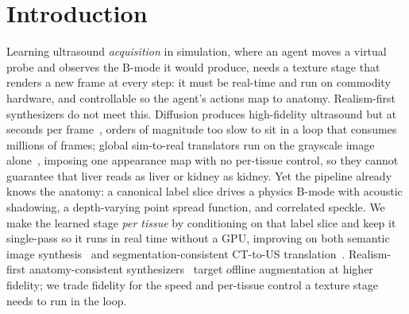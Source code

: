 \documentclass[runningheads]{llncs}
\begin{document}
\section{Introduction}
Learning ultrasound \emph{acquisition} in simulation, where an agent moves a virtual probe and observes
the B-mode it would produce, needs a texture stage that renders a new frame at every step: it must be
real-time and run on commodity hardware, and controllable so the agent's actions map to anatomy.
Realism-first synthesizers do not meet this. Diffusion produces high-fidelity ultrasound but at seconds
per frame~\cite{stojanovski2023echofromnoise}, orders of magnitude too slow to sit in a loop that
consumes millions of frames; global sim-to-real translators run on the grayscale image
alone~\cite{song2024scyclegan}, imposing one appearance map with no per-tissue control, so they cannot
guarantee that liver reads as liver or kidney as kidney. Yet the pipeline already knows the anatomy: a
canonical label slice drives a physics B-mode with acoustic shadowing, a depth-varying point spread
function, and correlated speckle. We make the learned stage \emph{per tissue} by conditioning on that
label slice and keep it single-pass so it runs in real time without a GPU, improving on both semantic
image synthesis~\cite{park2019spade} and segmentation-consistent CT-to-US
translation~\cite{song2024scyclegan}. Realism-first anatomy-consistent
synthesizers~\cite{vitale2025realism} target offline augmentation at higher fidelity; we trade fidelity
for the speed and per-tissue control a texture stage needs to run in the loop.
\end{document}
